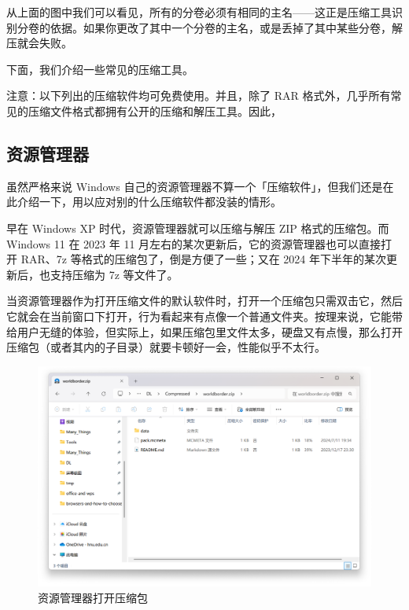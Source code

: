 {\begin{note}
  从上面的图中我们可以看见，所有的分卷必须有相同的主名——这正是压缩工具识别分卷的依据。如果你更改了其中一个分卷的主名，或是丢掉了其中某些分卷，解压就会失败。
\end{note}

下面，我们介绍一些常见的压缩工具。

\begin{warning}
  注意：以下列出的压缩软件均可免费使用。并且，除了 RAR 格式外，几乎所有常见的压缩文件格式都拥有公开的压缩和解压工具。因此，
\end{warning}

\subsection{资源管理器}

虽然严格来说 Windows 自己的资源管理器不算一个「压缩软件」，但我们还是在此介绍一下，用以应对别的什么压缩软件都没装的情形。

早在 Windows XP 时代，资源管理器就可以压缩与解压 ZIP 格式的压缩包。而 Windows 11 在 2023 年 11 月左右的某次更新后，它的资源管理器也可以直接打开 RAR、7z 等格式的压缩包了，倒是方便了一些；又在 2024 年下半年的某次更新后，也支持压缩为 7z 等文件了。

当资源管理器作为打开压缩文件的默认软件时，打开一个压缩包只需双击它，然后它就会在当前窗口下打开，行为看起来有点像一个普通文件夹。按理来说，它能带给用户无缝的体验，但实际上，如果压缩包里文件太多，硬盘又有点慢，那么打开压缩包（或者其内的子目录）就要卡顿好一会，性能似乎不太行。

\begin{figure}[htb!]
  \centering
  \includegraphics[width=.7\textwidth]{assets/software/explorer-open-zip.png}
  \caption{资源管理器打开压缩包}
  \label{fig:explorer-open-zip}
\end{figure}

}
